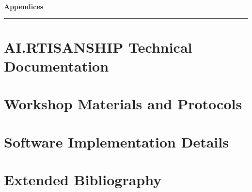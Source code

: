 \clearpage

\setcounter{chapter}{6}
\setcounter{section}{0}


\pagestyle{fancy}
\fancyhf{} %
\fancyfoot[C]{\thepage} %
\renewcommand{\headrulewidth}{0pt}
\renewcommand{\footrulewidth}{0pt}

\noindent
{\Large\textbf{Appendices}}
\vspace{0.3cm}
\hrule
\vspace{0.8cm}
\label{ch:appendices}

\setlength{\parindent}{0pt}


\section{AI.RTISANSHIP Technical Documentation}


\section{Workshop Materials and Protocols}


\section{Software Implementation Details}


\section{Extended Bibliography}

